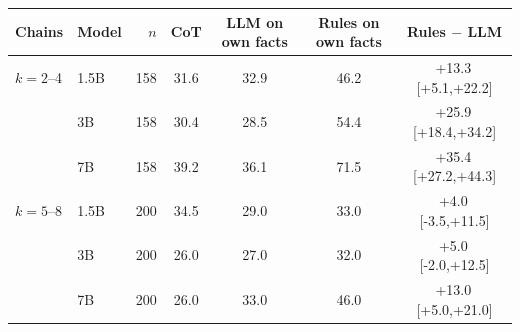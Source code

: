 \begin{tabular}{llrcccc}
\toprule
Chains & Model & $n$ & CoT & LLM on own facts & Rules on own facts & Rules $-$ LLM \\
\midrule
$k{=}2$--4 & 1.5B & 158 & 31.6 & 32.9 & 46.2 & +13.3\,{\scriptsize[+5.1,+22.2]} \\
 & 3B & 158 & 30.4 & 28.5 & 54.4 & +25.9\,{\scriptsize[+18.4,+34.2]} \\
 & 7B & 158 & 39.2 & 36.1 & 71.5 & +35.4\,{\scriptsize[+27.2,+44.3]} \\
\midrule
$k{=}5$--8 & 1.5B & 200 & 34.5 & 29.0 & 33.0 & +4.0\,{\scriptsize[-3.5,+11.5]} \\
 & 3B & 200 & 26.0 & 27.0 & 32.0 & +5.0\,{\scriptsize[-2.0,+12.5]} \\
 & 7B & 200 & 26.0 & 33.0 & 46.0 & +13.0\,{\scriptsize[+5.0,+21.0]} \\
\bottomrule
\end{tabular}
